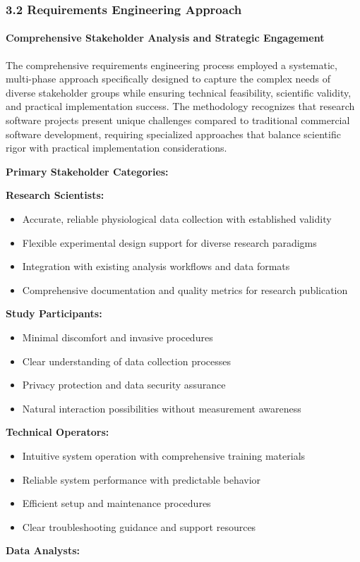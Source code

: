 \documentclass[12pt,a4paper]{report}
\begin{document}
\subsubsection{3.2 Requirements Engineering Approach}

\paragraph{Comprehensive Stakeholder Analysis and Strategic Engagement}

The comprehensive requirements engineering process employed a systematic, multi-phase approach specifically designed to
capture the complex needs of diverse stakeholder groups while ensuring technical feasibility, scientific validity, and
practical implementation success. The methodology recognizes that research software projects present unique challenges
compared to traditional commercial software development, requiring specialized approaches that balance scientific rigor
with practical implementation considerations.

\textbf{Primary Stakeholder Categories:}

\textbf{Research Scientists:}

\begin{itemize}
\item Accurate, reliable physiological data collection with established validity
\item Flexible experimental design support for diverse research paradigms
\item Integration with existing analysis workflows and data formats
\item Comprehensive documentation and quality metrics for research publication

\end{itemize}
\textbf{Study Participants:}

\begin{itemize}
\item Minimal discomfort and invasive procedures
\item Clear understanding of data collection processes
\item Privacy protection and data security assurance
\item Natural interaction possibilities without measurement awareness

\end{itemize}
\textbf{Technical Operators:}

\begin{itemize}
\item Intuitive system operation with comprehensive training materials
\item Reliable system performance with predictable behavior
\item Efficient setup and maintenance procedures
\item Clear troubleshooting guidance and support resources

\end{itemize}
\textbf{Data Analysts:}
\end{document}
